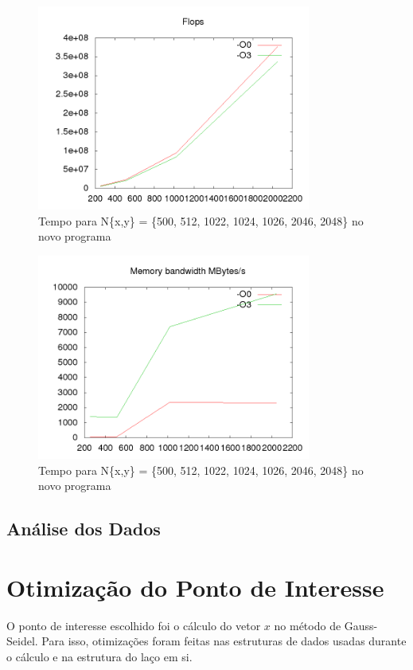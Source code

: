 \documentclass[12pt]{article}
\begin{document}
		\begin{figure}[ht!]
			\centering
			\includegraphics[width=90mm]{new_res_flops.png}
			\caption{Tempo para N\{x,y\} = \{500, 512, 1022, 1024, 1026, 2046, 2048\} no novo programa
			\label{overflow}}
		\end{figure}
		\newpage
		
		\begin{figure}[ht!]
			\centering
			\includegraphics[width=90mm]{new_res_mem.png}
			\caption{Tempo para N\{x,y\} = \{500, 512, 1022, 1024, 1026, 2046, 2048\} no novo programa
			\label{overflow}}
		\end{figure}
		\newpage
		
	\subsection{Análise dos Dados}

\newpage

\section{Otimização do Ponto de Interesse}

O ponto de interesse escolhido foi o cálculo do vetor $x$ no método de Gauss-Seidel.
Para isso, otimizações foram feitas nas estruturas de dados usadas durante o cálculo e na estrutura do laço em si.
\end{document}
